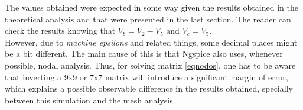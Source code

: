 \vspace{10px}

The values obtained were expected in some way given the results obtained in the theoretical analysis and that were presented in the last section. The reader can check the results knowing that $V_b = V_2 -V_5$ and $V_c = V_5$.\\

However, due to \textit{machine epsilons} and related things, some decimal places might be a bit different. The main cause of this is that Ngspice also uses, whenever possible, nodal analysis. Thus, for solving matrix \ref{eqnodos}, one has to be aware that inverting a 9x9 or 7x7 matrix will introduce a significant margin of error, which explains a possible observable difference in the results obtained, specially between this simulation and the mesh analysis.
